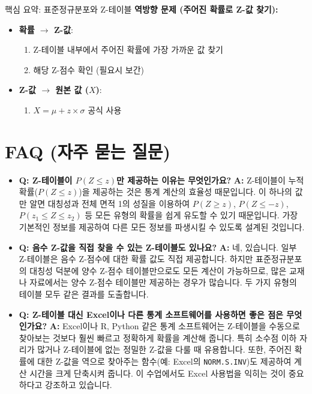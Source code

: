 \documentclass[11pt,a4paper]{article}
\begin{document}
\begin{summarybox}{핵심 요약: 표준정규분포와 Z-테이블}
\textbf{역방향 문제 (주어진 확률로 Z-값 찾기):}
\begin{itemize}
    \item \textbf{확률 $\rightarrow$ Z-값}:
        \begin{enumerate}
            \item Z-테이블 내부에서 주어진 확률에 가장 가까운 값 찾기
            \item 해당 Z-점수 확인 (필요시 보간)
        \end{enumerate}
    \item \textbf{Z-값 $\rightarrow$ 원본 값 ($X$)}:
        \begin{enumerate}
            \item $X = \mu + z \times \sigma$ 공식 사용
        \end{enumerate}
\end{itemize}
\end{summarybox}

\newpage
\section*{FAQ (자주 묻는 질문)}

\begin{itemize}
    \item \textbf{Q: Z-테이블이 $P(Z \le z)$만 제공하는 이유는 무엇인가요?}
    \textbf{A:} Z-테이블이 누적 확률($P(Z \le z)$)을 제공하는 것은 통계 계산의 효율성 때문입니다. 이 하나의 값만 알면 대칭성과 전체 면적 1의 성질을 이용하여 $P(Z \ge z)$, $P(Z \le -z)$, $P(z_1 \le Z \le z_2)$ 등 모든 유형의 확률을 쉽게 유도할 수 있기 때문입니다. 가장 기본적인 정보를 제공하여 다른 모든 정보를 파생시킬 수 있도록 설계된 것입니다.

    \item \textbf{Q: 음수 Z-값을 직접 찾을 수 있는 Z-테이블도 있나요?}
    \textbf{A:} 네, 있습니다. 일부 Z-테이블은 음수 Z-점수에 대한 확률 값도 직접 제공합니다. 하지만 표준정규분포의 대칭성 덕분에 양수 Z-점수 테이블만으로도 모든 계산이 가능하므로, 많은 교재나 자료에서는 양수 Z-점수 테이블만 제공하는 경우가 많습니다. 두 가지 유형의 테이블 모두 같은 결과를 도출합니다.

    \item \textbf{Q: Z-테이블 대신 Excel이나 다른 통계 소프트웨어를 사용하면 좋은 점은 무엇인가요?}
    \textbf{A:} Excel이나 R, Python 같은 통계 소프트웨어는 Z-테이블을 수동으로 찾아보는 것보다 훨씬 빠르고 정확하게 확률을 계산해 줍니다. 특히 소수점 이하 자리가 많거나 Z-테이블에 없는 정밀한 Z-값을 다룰 때 유용합니다. 또한, 주어진 확률에 대한 Z-값을 역으로 찾아주는 함수(예: Excel의 \texttt{NORM.S.INV})도 제공하여 계산 시간을 크게 단축시켜 줍니다. 이 수업에서도 Excel 사용법을 익히는 것이 중요하다고 강조하고 있습니다.
\end{itemize}
\end{document}
